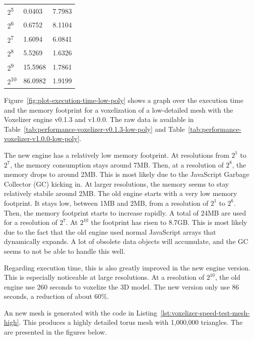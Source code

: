 \begin{table}[H]
\begin{minipage}[t]{.45\linewidth}
\begin{tabularx}{\textwidth}{*{3}{|Y}|}
            2\textsuperscript{5} & 0.0403 & 7.7983\\
            2\textsuperscript{6} & 0.6752 & 8.1104\\
            2\textsuperscript{7} & 1.6094 & 6.0841\\
            2\textsuperscript{8} & 5.5269 & 1.6326\\
            2\textsuperscript{9} & 15.5968 & 1.7861\\
            2\textsuperscript{10} & 86.0982 & 1.9199\\
            \hline
        \end{tabularx}
    \end{minipage}
\end{table}

Figure~\ref{fig:plot-execution-time-low-poly} shows a graph over the execution time and the memory footprint for a voxelization of a low-detailed mesh with the Voxelizer engine v0.1.3 and v1.0.0. The raw data is available in Table~\ref{tab:performance-voxelizer-v0.1.3-low-poly} and Table~\ref{tab:performance-voxelizer-v1.0.0-low-poly}.

The new engine has a relatively low memory footprint. At resolutions from $2^1$ to $2^7$, the memory consumption stays around 7MB. Then, at a resolution of $2^8$, the memory drops to around 2MB. This is most likely due to the JavaScript Garbage Collector (GC) kicking in. At larger resolutions, the memory seems to stay relatively stabile around 2MB. The old engine starts with a very low memory footprint. It stays low, between 1MB and 2MB, from a resolution of $2^1$ to $2^6$. Then, the memory footprint starts to increase rapidly. A total of 24MB are used for a resolution of $2^7$. At $2^{10}$ the footprint has risen to 8.7GB. This is most likely due to the fact that the old engine used normal JavaScript arrays that dynamically expands. A lot of obsolete data objects will accumulate, and the GC seems to not be able to handle this well.

Regarding execution time, this is also greatly improved in the new engine version. This is especially noticeable at large resolutions. At a resolution of $2^{10}$, the old engine use 260 seconds to voxelize the 3D model. The new version only use 86 seconds, a reduction of about $60\%$.

An new mesh is generated with the code in Listing~\ref{lst:voxelizer-speed-test-mesh-high}. This produces a highly detailed torus mesh with 1,000,000 triangles. The are presented in the figures below.

